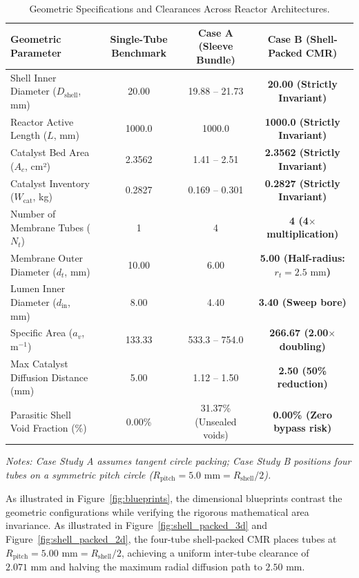 \documentclass[12pt,a4paper]{article}
\begin{document}
\begin{table}[htbp]
\centering
\caption{Geometric Specifications and Clearances Across Reactor Architectures.}
\label{tab:geometry}
\begin{tabular*}{\textwidth}{@{\extracolsep{\fill}}lccc@{}}
\toprule
\textbf{Geometric Parameter} & \textbf{Single-Tube Benchmark} & \textbf{Case A (Sleeve Bundle)} & \textbf{Case B (Shell-Packed CMR)} \\
\midrule
Shell Inner Diameter ($D_{\text{shell}}$, mm) & 20.00 & 19.88 – 21.73 & \textbf{20.00 (Strictly Invariant)} \\
Reactor Active Length ($L$, mm) & 1000.0 & 1000.0 & \textbf{1000.0 (Strictly Invariant)} \\
Catalyst Bed Area ($A_c$, cm²) & 2.3562 & 1.41 – 2.51 & \textbf{2.3562 (Strictly Invariant)} \\
Catalyst Inventory ($W_{\text{cat}}$, kg) & 0.2827 & 0.169 – 0.301 & \textbf{0.2827 (Strictly Invariant)} \\
Number of Membrane Tubes ($N_t$) & 1 & 4 & \textbf{4 (4$\times$ multiplication)} \\
Membrane Outer Diameter ($d_t$, mm) & 10.00 & 6.00 & \textbf{5.00 (Half-radius: $r_t = 2.5\text{ mm}$)} \\
Lumen Inner Diameter ($d_{\text{in}}$, mm) & 8.00 & 4.40 & \textbf{3.40 (Sweep bore)} \\
Specific Area ($a_v$, $\text{m}^{-1}$) & 133.33 & 533.3 – 754.0 & \textbf{266.67 (2.00$\times$ doubling)} \\
Max Catalyst Diffusion Distance (mm) & 5.00 & 1.12 – 1.50 & \textbf{2.50 (50\% reduction)} \\
Parasitic Shell Void Fraction (\%) & 0.00\% & 31.37\% (Unsealed voids) & \textbf{0.00\% (Zero bypass risk)} \\
\bottomrule
\end{tabular*}
\vspace{2pt}
{\raggedright\small\itshape Notes: Case Study A assumes tangent circle packing; Case Study B positions four tubes on a symmetric pitch circle ($R_{\text{pitch}} = 5.0\text{ mm} = R_{\text{shell}} / 2$).\par}
\end{table}

As illustrated in Figure~\ref{fig:blueprints}, the dimensional blueprints contrast the geometric configurations while verifying the rigorous mathematical area invariance. As illustrated in Figure~\ref{fig:shell_packed_3d} and Figure~\ref{fig:shell_packed_2d}, the four-tube shell-packed CMR places tubes at $R_{\text{pitch}} = 5.00\text{ mm} = R_{\text{shell}}/2$, achieving a uniform inter-tube clearance of $2.071\text{ mm}$ and halving the maximum radial diffusion path to $2.50\text{ mm}$.
\end{document}
